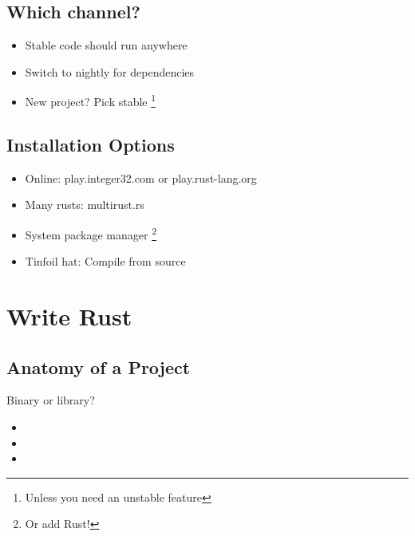 \documentclass[xcolor={svgnames},hyperref]{beamer}
\begin{document}
    \subsection{Which channel?}

    \begin{frame}
        \begin{itemize}
            \item Stable code should run anywhere
            \item Switch to nightly for dependencies
            \item New project? Pick stable \footnote{Unless you need an
                  unstable feature}
        \end{itemize}
    \end{frame}


    \subsection{Installation Options}

    \begin{frame}
        \begin{itemize}
            \item Online: play.integer32.com or play.rust-lang.org
            \item Many rusts: multirust.rs
            \item System package manager \footnote{Or add Rust!}
            \item Tinfoil hat: Compile from source
        \end{itemize}
    \end{frame}


\section{Write Rust}

\subsection{Anatomy of a Project}

    \begin{frame}
        Binary or library?
        \begin{itemize}
            \item
            \item
            \item
        \end{itemize}
    \end{frame}
\end{document}

